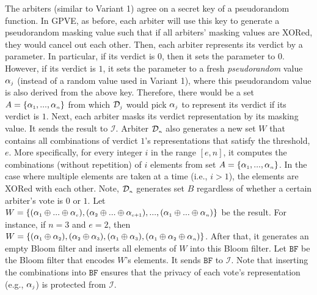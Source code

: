 The arbiters (similar to Variant 1) agree on a secret key of a pseudorandom function. In GPVE,  as before, each arbiter will use this key to  generate a pseudorandom masking value such that if all arbiters' masking values are XORed, they would cancel out each other. Then, each arbiter represents its verdict by a parameter. In particular, if its verdict is $0$, then  it  sets the parameter to  $0$. However, if   its verdict is $1$, it sets the parameter to a fresh \emph{pseudorandom} value $\alpha_{\scriptscriptstyle j}$ (instead of a random value used in Variant 1),  where this  pseudorandom value is also derived from the above key. Therefore, there would be a set $A=\{\alpha_{\scriptscriptstyle 1},..., \alpha_{\scriptscriptstyle n}\}$ from which  $\mathcal{D}_{\scriptscriptstyle j}$ would pick $\alpha_{\scriptscriptstyle j}$ to represent its verdict if its verdict is $1$. Next, each arbiter masks its verdict representation by its masking  value. It sends the result to $\mathcal{I}$. Arbiter $\mathcal{D}_{\scriptscriptstyle n}$ also generates a new set $W$ that contains all  combinations of verdict $1$'s representations that satisfy the threshold, $e$. More specifically,  for every integer $i$ in the range $[e, n]$, it computes the combinations (without repetition) of $i$ elements from set $A=\{\alpha_{\scriptscriptstyle 1},..., \alpha_{\scriptscriptstyle n}\}$. In the case where  multiple elements are taken at a time (i.e., $i>1$), the elements are XORed with each other.   Note, $\mathcal{D}_{\scriptscriptstyle n}$ generates  set $B$  regardless of whether a certain arbiter's  vote is $0$ or $1$. Let $W=\{(\alpha_{\scriptscriptstyle 1}\oplus ... \oplus \alpha_{\scriptscriptstyle e}),  (\alpha_{\scriptscriptstyle 2}\oplus  ... \oplus \alpha_{\scriptscriptstyle e+1}), ..., (\alpha_{\scriptscriptstyle 1}\oplus ... \oplus \alpha_{\scriptscriptstyle n})\}$ be the result. For instance, if $n=3$ and $e=2$,  then $W=\{(\alpha_{\scriptscriptstyle 1}\oplus \alpha_{\scriptscriptstyle 2}),  (\alpha_{\scriptscriptstyle 2}\oplus  \alpha_{\scriptscriptstyle 3}), (\alpha_{\scriptscriptstyle 1}\oplus \alpha_{\scriptscriptstyle 3}), (\alpha_{\scriptscriptstyle 1}\oplus \alpha_{\scriptscriptstyle 2} \oplus \alpha_{\scriptscriptstyle n})\}$. After that, it generates an empty Bloom filter and  inserts all elements of $W$ into this Bloom filter. Let $\mathtt{BF}$ be the Bloom filter that encodes $W$'s elements. It sends $\mathtt{BF}$ to $\mathcal{I}$. Note that inserting the combinations into $\mathtt{BF}$ ensures that the privacy of  each vote's representation (e.g., $\alpha_{\scriptscriptstyle j}$) is protected from $\mathcal{I}$. 



